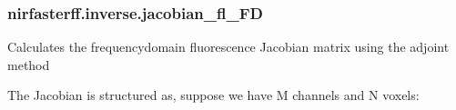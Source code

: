 \documentclass[letterpaper,10pt,english]{sphinxmanual}
\begin{document}
\sphinxstepscope


\subsubsection{nirfasterff.inverse.jacobian\_fl\_FD}
\label{\detokenize{_autosummary/nirfasterff.inverse.jacobian_fl_FD:nirfasterff-inverse-jacobian-fl-fd}}\label{\detokenize{_autosummary/nirfasterff.inverse.jacobian_fl_FD::doc}}

\begin{fulllineitems}
\label{\detokenize{_autosummary/nirfasterff.inverse.jacobian_fl_FD:nirfasterff.inverse.jacobian_fl_FD}}
\pysigstartsignatures
\pysiglinewithargsret
{}
{\sphinxparamcomma {}\sphinxparamcomma {}\sphinxparamcomma {}\sphinxparamcomma {}}
{}
\pysigstopsignatures
\sphinxAtStartPar
Calculates the frequency\sphinxhyphen{}domain fluorescence Jacobian matrix using the adjoint method

\sphinxAtStartPar
The Jacobian is structured as, suppose we have M channels and N voxels:


\end{fulllineitems}
\end{document}
